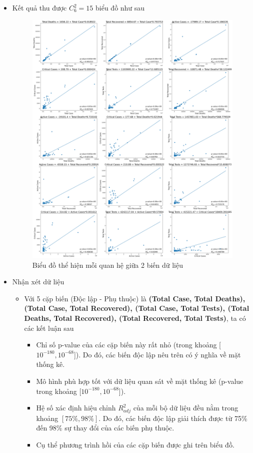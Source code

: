 \documentclass[a4paper, 12pt]{article}
\begin{document}
\begin{itemize}
        \item Kết quả thu được $C_6^2 = 15$  biểu đồ như sau
        \begin{figure}[H]
            \begin{center}
                \includegraphics[scale=0.2]{img/scatter.png}
                \caption{Biểu đồ thể hiện mỗi quan hệ giữa 2 biến dữ liệu}
            \end{center}
        \end{figure}

        \item Nhận xét dữ liệu
        \begin{itemize}
            \item Với 5 cặp biến (Độc lập - Phụ thuộc) là \textbf{(Total Case, Total Deaths), (Total Case, Total Recovered), (Total Case, Total Tests), (Total Deaths, Total Recovered), (Total Recovered, Total Tests)}, ta có các kết luận sau
            \begin{itemize}
                \item Chỉ số p-value của các cặp biến này rất nhỏ (trong khoảng [$10^{-180}, 10^{-68}$]). Do đó, các biến độc lập nêu trên có ý nghĩa về mặt thống kê.
                \item Mô hình phù hợp tốt với dữ liệu quan sát về mặt thống kê (p-value trong khoảng [$10^{-180}, 10^{-68}$]).
                \item Hệ số xác định hiệu chỉnh $R_{adj}^2$ của mỗi bộ dữ liệu đều nằm trong khoảng $[75\%, 98\%]$. Do đó, các biến độc lập giải thích được từ 75\% đến 98\% sự thay đổi của các biến phụ thuộc.
                \item Cụ thể phương trình hồi của các cặp biến được ghi trên biểu đồ.
            \end{itemize}


\end{itemize}
\end{itemize}
\end{document}
